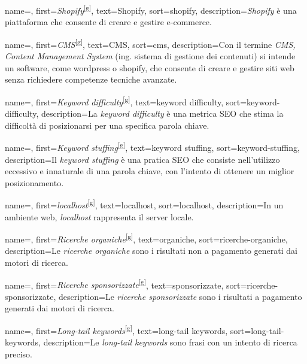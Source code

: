  {
    name=,
    first={\textit{Shopify}\textsuperscript{[g]}},
    text=Shopify,
    sort=shopify,
    description={\emph{Shopify} è una piattaforma che consente di creare e gestire e-commerce.}
}

 {
    name=,
    first={\textit{CMS}\textsuperscript{[g]}},
    text=CMS,
    sort=cms,
    description={Con il termine \emph{CMS, Content Management System} (ing. sistema di gestione dei contenuti) si intende un software, come \gls{wordpress} o \gls{shopify}, che consente di creare e gestire siti web senza richiedere competenze tecniche avanzate.}
}

 {
    name=,
    first={\textit{Keyword difficulty}\textsuperscript{[g]}},
    text=keyword difficulty,
    sort=keyword-difficulty,
    description={La \emph{keyword difficulty} è una metrica SEO che stima la difficoltà di posizionarsi per una specifica parola chiave.}
}

 {
    name=,
    first={\textit{Keyword stuffing}\textsuperscript{[g]}},
    text=keyword stuffing,
    sort=keyword-stuffing,
    description={Il \emph{keyword stuffing} è una pratica SEO che consiste nell'utilizzo eccessivo e innaturale di una parola chiave, con l'intento di ottenere un miglior posizionamento.}
}

 {
    name=,
    first={\textit{localhost}\textsuperscript{[g]}},
    text=localhost,
    sort=localhost,
    description={In un ambiente web, \emph{localhost} rappresenta il server locale.}
}

 {
    name=,
    first={\textit{Ricerche organiche}\textsuperscript{[g]}},
    text=organiche,
    sort=ricerche-organiche,
    description={Le \emph{ricerche organiche} sono i risultati non a pagamento generati dai motori di ricerca.}
}

 {
    name=,
    first={\textit{Ricerche sponsorizzate}\textsuperscript{[g]}},
    text=sponsorizzate,
    sort=ricerche-sponsorizzate,
    description={Le \emph{ricerche sponsorizzate} sono i risultati a pagamento generati dai motori di ricerca.}
}

 {
    name=,
    first={\textit{Long-tail keywords}\textsuperscript{[g]}},
    text=long-tail keywords,
    sort=long-tail-keywords,
    description={Le \emph{long-tail keywords} sono frasi con un intento di ricerca preciso.}
}

